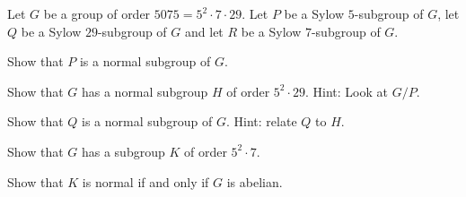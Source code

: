 Let $G$ be a group of order $5075=5^2\cdot 7 \cdot 29$. Let $P$
be a Sylow $5$-subgroup of $G$, let $Q$ be a Sylow $29$-subgroup of
$G$ and let $R$ be a Sylow $7$-subgroup of $G$.
\begin{alist}
\item Show that $P$ is a normal subgroup of $G$.
\item Show that $G$ has a normal subgroup $H$ of order $5^2\cdot
29$. Hint: Look at $G/P$.
\item Show that $Q$ is a normal subgroup of $G$. Hint: relate $Q$ to
$H$.
\item Show that $G$ has a subgroup $K$ of order $5^2\cdot 7$. 
\item Show that $K$ is normal if and only if $G$ is abelian.
\end{alist}
